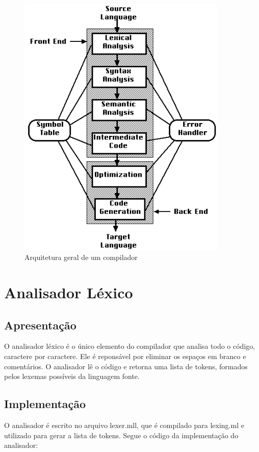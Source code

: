 \documentclass[12pt,a4paper,twoside]{report}
\begin{document}
\begin{figure}[h]
	\centering
	\includegraphics[width=10cm]{imagens/arquitetura-compilador}
	\caption{Arquitetura geral de um compilador}
	\label{fig:arquitetura-compilador}
\end{figure}

\section{Analisador Léxico}

\subsection{Apresentação}
O analisador léxico é o único elemento do compilador que analisa todo o código, caractere por caractere.
Ele é reponsável por eliminar os espaços em branco e comentários. O analisador lê o código e retorna uma
lista de tokens, formados pelos lexemas possíveis da linguagem fonte.

\subsection{Implementação}

O analisador é escrito no arquivo lexer.mll, que é compilado para lexing.ml e utilizado para gerar a lista de tokens.
Segue o código da implementação do analisador:
\end{document}
